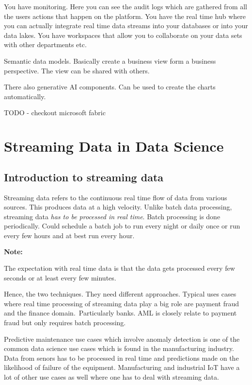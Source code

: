 \documentclass[a4paper, 11pt]{book}
\newenvironment{note}{
    \begin{siderule}
        \textbf{Note: }
        }{
    \end{siderule}}
\begin{document}
    You have monitoring.
    Here you can see the audit logs which are gathered from all the users actions that happen on the platform.
    You have the real time hub where you can actually integrate real time data streams into your databases or into your data lakes.
    You have workspaces that allow you to collaborate on your data sets with other departments etc.

    Semantic data models.
    Basically create a business view form a business perspective. The view can be shared with others.

    There also generative AI components. Can be used to create the charts automatically.

    TODO - checkout microsoft fabric


    \section{Streaming Data in Data Science}

    \subsection{Introduction to streaming data}

    Streaming data refers to the continuous real time flow of data from various sources.
    This produces data at a high velocity.
    Unlike batch data processing, streaming data \textit{has to be processed in real time}.
    Batch processing is done periodically.
    Could schedule a batch job to run every night or daily once or run every few hours and at best run every hour.

    \begin{note}
        The expectation with real time data is that the data gets processed every few seconds or at least every few minutes.
    \end{note}

    Hence, the two techniques.
    They need different approaches.
    Typical uses cases where real time processing of streaming data play a big role are payment fraud and the finance domain.\ Particularly banks.
    AML is closely relate to payment fraud but only requires batch processing.

    Predictive maintenance use cases which involve anomaly detection is one of the common data science use cases which is found in the manufacturing industry.
    Data from senors has to be processed in real time and predictions made on the likelihood of failure of the equipment.
    Manufacturing and industrial IoT have a lot of other use cases as well where one has to deal with streaming data.
\end{document}
